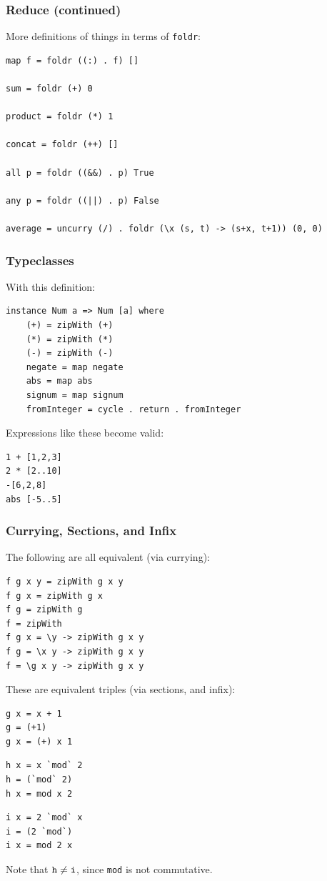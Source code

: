 \documentclass{beamer}
\begin{document}
\begin{frame}[fragile]
\frametitle{Reduce (continued)}
More definitions of things in terms of \verb|foldr|:
\begin{Verbatim}[frame=single, fontsize=\scriptsize]
map f = foldr ((:) . f) []

sum = foldr (+) 0

product = foldr (*) 1

concat = foldr (++) []

all p = foldr ((&&) . p) True

any p = foldr ((||) . p) False

average = uncurry (/) . foldr (\x (s, t) -> (s+x, t+1)) (0, 0)
\end{Verbatim}
\end{frame}

\begin{frame}[fragile]
\frametitle{Typeclasses}
With this definition:
\begin{Verbatim}[frame=single, fontsize=\scriptsize]
instance Num a => Num [a] where
    (+) = zipWith (+)
    (*) = zipWith (*)
    (-) = zipWith (-)
    negate = map negate
    abs = map abs
    signum = map signum
    fromInteger = cycle . return . fromInteger
\end{Verbatim}
Expressions like these become valid:
\begin{Verbatim}[frame=single, fontsize=\scriptsize]
1 + [1,2,3]
2 * [2..10]
-[6,2,8]
abs [-5..5]
\end{Verbatim}
\end{frame}

\begin{frame}[fragile]
\frametitle{Currying, Sections, and Infix}
The following are all equivalent (via currying):
\begin{Verbatim}[frame=single, fontsize=\scriptsize]
f g x y = zipWith g x y
f g x = zipWith g x
f g = zipWith g
f = zipWith
f g x = \y -> zipWith g x y
f g = \x y -> zipWith g x y
f = \g x y -> zipWith g x y
\end{Verbatim}
These are equivalent triples (via sections, and infix):
\begin{Verbatim}[frame=single, fontsize=\scriptsize]
g x = x + 1
g = (+1)
g x = (+) x 1
\end{Verbatim}
\begin{Verbatim}[frame=single, fontsize=\scriptsize]
h x = x `mod` 2
h = (`mod` 2)
h x = mod x 2
\end{Verbatim}
\begin{Verbatim}[frame=single, fontsize=\scriptsize]
i x = 2 `mod` x
i = (2 `mod`)
i x = mod 2 x
\end{Verbatim}
Note that $\verb|h| \neq \verb|i|$, since \verb|mod| is not commutative.
\end{frame}
\end{document}
